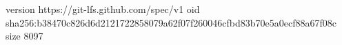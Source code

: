 version https://git-lfs.github.com/spec/v1
oid sha256:b38470c826d6d2121722858079a62f07f260046cfbd83b70e5a0ecf88a67f08c
size 8097
